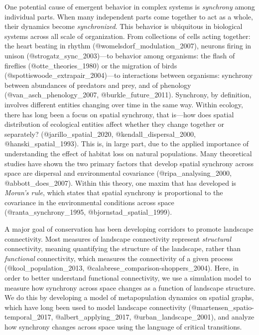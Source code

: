 One potential cause of emergent behavior in complex systems is
\emph{synchrony} among individual parts. When many independent parts
come together to act as a whole, their dynamics become
\emph{synchronized}. This behavior is ubiquitous in biological systems
across all scale of organization. From collections of cells acting
together: the heart beating in rhythm (@womelsdorf\_modulation\_2007),
neurons firing in unison (@strogatz\_sync\_2003)---to behavior among
organisms: the flash of fireflies (@otte\_theories\_1980) or the
migration of birds (@spottiswoode\_extrapair\_2004)---to interactions
between organisms: synchrony between abundances of predators and prey,
and of phenology (@van\_asch\_phenology\_2007, @burkle\_future\_2011).
Synchrony, by definition, involves different entities changing over time
in the same way. Within ecology, there has long been a focus on spatial
synchrony, that is---how does spatial distribution of ecological
entities affect whether they change together or separately?
(@jarillo\_spatial\_2020, @kendall\_dispersal\_2000,
@hanski\_spatial\_1993). This is, in large part, due to the applied
importance of understanding the effect of habitat loss on natural
populations. Many theoretical studies have shown the two primary factors
that develop spatial synchrony across space are dispersal and
environmental covariance (@ripa\_analysing\_2000, @abbott\_does\_2007).
Within this theory, one maxim that has developed is \emph{Moran's rule},
which states that spatial synchrony is proportional to the covariance in
the environmental conditions across space (@ranta\_synchrony\_1995,
@bjornstad\_spatial\_1999).

A major goal of conservation has been developing corridors to promote
landscape connectivity. Most measures of landscape connectivity
represent \emph{structural} connectivity, meaning quantifying the
structure of the landscape, rather than \emph{functional} connectivity,
which measures the connectivity of a given process
(@kool\_population\_2013, @calabrese\_comparison-shoppers\_2004). Here,
in order to better understand functional connectivity, we use a
simulation model to measure how synchrony across space changes as a
function of landscape structure. We do this by developing a model of
metapopulation dynamics on spatial graphs, which have long been used to
model landscape connectivity (@martensen\_spatio-temporal\_2017,
@albert\_applying\_2017, @urban\_landscape\_2001), and analyze how
synchrony changes across space using the language of critical
transitions.

